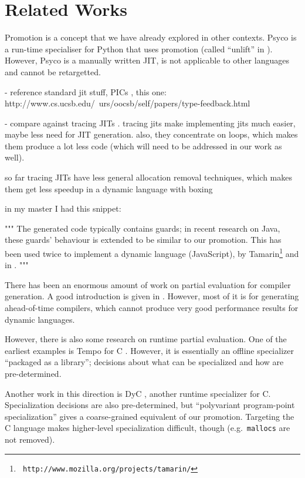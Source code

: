 \section{Related Works}
Promotion is a concept that we have already explored in other contexts. Psyco is
a run-time specialiser for Python that uses promotion (called ``unlift'' in
\cite{DBLP:conf/pepm/Rigo04}). However, Psyco is a manually written JIT, is
not applicable to other languages and cannot be retargetted.


 - reference standard jit stuff, PICs \cite{hoelzle_optimizing_1991}, this one: http://www.cs.ucsb.edu/~urs/oocsb/self/papers/type-feedback.html
 
 - compare against tracing JITs \cite{gal_hotpathvm_2006}. tracing jits make
 implementing jits much easier, maybe less need for JIT generation. also, they
 concentrate on loops, which makes them produce a lot less code (which will need
 to be addressed in our work as well).

 so far tracing JITs have less general allocation removal techniques, which
 makes them get less speedup in a dynamic language with boxing

in my master I had this snippet:

"""
The generated code typically contains guards; in recent research
\cite{gal_incremental_2006} on Java, these guards' behaviour is extended to be
similar to our promotion.  This has been used twice to implement a dynamic
language (JavaScript), by Tamarin\footnote{{\tt
http://www.mozilla.org/projects/tamarin/}} and in \cite{chang_efficient_2007}.
"""

There has been an enormous amount of work on partial evaluation for compiler
generation. A good introduction is given in \cite{Jones:peval}. However, most of
it is for generating ahead-of-time compilers, which cannot produce very good
performance results for dynamic languages.

However, there is also some research on runtime partial evaluation. One of the
earliest examples is Tempo for C
\cite{DBLP:conf/popl/ConselN96,DBLP:conf/dagstuhl/ConselHNNV96}. However, it is
essentially an offline specializer ``packaged as a library''; decisions about
what can be specialized and how are pre-determined.

Another work in this direction is DyC \cite{grant_dyc_2000}, another runtime
specializer for C.  Specialization decisions are also pre-determined, but
``polyvariant program-point specialization'' gives a coarse-grained equivalent
of our promotion.  Targeting the C language makes higher-level specialization
difficult, though (e.g.\ \texttt{mallocs} are not removed).

